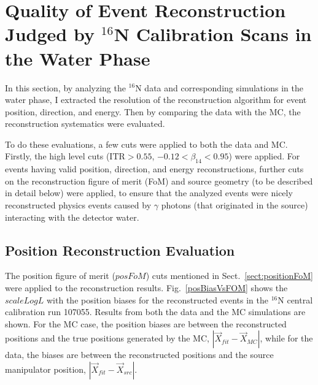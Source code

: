 \section{Quality of Event Reconstruction Judged by $^{16}$N Calibration Scans in the Water Phase}

In this section, by analyzing the $^{16}$N data and corresponding simulations in the water phase, I extracted the resolution of the reconstruction algorithm for event position, direction, and energy. Then by comparing the data with the MC, the reconstruction systematics were evaluated.

To do these evaluations, a few cuts were applied to both the data and MC. Firstly, the high level cuts ($\mathrm{ITR}>0.55$, $-0.12<\beta_{14}<0.95$) were applied. For events having valid position, direction, and energy reconstructions, further cuts on the reconstruction figure of merit (FoM) and source geometry (to be described in detail below) were applied, to ensure that the analyzed events were nicely reconstructed physics events caused by $\gamma$ photons (that originated in the source) interacting with the detector water.

\subsection{Position Reconstruction Evaluation}

The position figure of merit ($posFoM$) cuts mentioned in Sect.~\ref{sect:positionFoM} were applied to the reconstruction results. Fig.~\ref{posBiasVsFOM} shows the $scaleLogL$ with the position biases for the reconstructed events in the $^{16}$N central calibration run 107055. Results from both the data and the MC simulations are shown. For the MC case, the position biases are between the reconstructed positions and the true positions generated by the MC, $|\vec{X}_{fit}-\vec{X}_{MC}|$, while for the data, the biases are between the reconstructed positions and the source manipulator position, $|\vec{X}_{fit}-\vec{X}_{src}|$.

